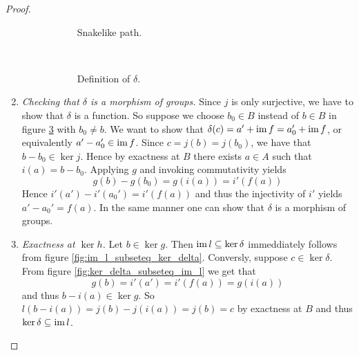 \begin{proof}
\begin{enumerate}[label = \textit{Step \arabic*:},wide = 0pt]
\begin{figure}[h!tb]
\begin{subfigure}[b]{.5\textwidth}
					\caption{Snakelike path.}
					\label{fig:snakelike_path}
				\end{subfigure}
				~
				\begin{subfigure}[b]{.5\textwidth}
					\caption{Definition of $\delta$.}
					\label{fig:definition_delta}					
				\end{subfigure}
				\caption{}
			\end{figure}
		\item \textit{Checking that $\delta$ is a morphism of groups.} Since $j$ is only surjective, we have to show that $\delta$ is a function. So suppose we choose $b_0 \in B$ instead of $b \in B$ in figure \ref{fig:definition_delta} with $b_0 \neq b$. We want to show that $\delta(c) = a' + \operatorname{im} f = a_0' + \operatorname{im} f$, or equivalently $a' - a_0' \in \operatorname{im} f$. Since $c = j(b) = j(b_0)$, we have that $b - b_0 \in \ker j$. Hence by exactness at $B$ there exists $a \in A$ such that $i(a) = b - b_0$. Applying $g$ and invoking commutativity yields
			\begin{equation*}
				g(b) - g(b_0) = g(i(a)) = i'(f(a))
			\end{equation*}
			Hence $i'(a') - i'(a_0')= i'(f(a))$ and thus the injectivity of $i'$ yields $a' - a_0' = f(a)$. In the same manner one can show that $\delta$ is a morphism of groups.
		\item \textit{Exactness at $\ker h$.} Let $b \in \ker g$. Then $\operatorname{im} l \subseteq \ker \delta$ immeddiately follows from figure \ref{fig:im_l_subseteq_ker_delta}. Conversly, suppose $c \in \ker \delta$. From figure \ref{fig:ker_delta_subseteq_im_l} we get that
			\begin{equation*}
				g(b) = i'(a') = i'(f(a)) = g(i(a))
			\end{equation*}
			\noindent and thus $b - i(a) \in \ker g$. So $l(b - i(a)) = j(b) - j(i(a)) = j(b) = c$ by exactness at $B$ and thus $\ker \delta \subseteq \operatorname{im} l$.

\end{enumerate}
\end{proof}
